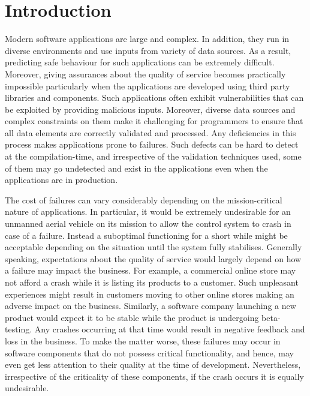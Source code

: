 \section{Introduction}
\label{sec:intro}



Modern software applications are large and complex. In addition, they run in
diverse environments and use inputs from variety of data sources. As a result,
predicting safe behaviour for such applications can be extremely difficult.
Moreover, giving assurances about the quality of service becomes practically
impossible particularly when the applications are developed using third party
libraries and components. Such applications often exhibit vulnerabilities that
can be exploited by providing malicious inputs. Moreover, diverse data sources
and complex constraints on them make it challenging for programmers to ensure
that all data elements are correctly validated and processed. Any deficiencies
in this process makes applications prone to failures.
Such defects can be hard to detect at the compilation-time, and irrespective
of the validation techniques used, some of them may go undetected and exist
in the applications even when the applications are in production.

The cost of failures can vary considerably depending on the mission-critical nature of
applications. In particular, it would be extremely undesirable for an unmanned aerial vehicle on
its mission to allow the control system to crash in case of a failure. Instead a
suboptimal functioning for a short while might be acceptable depending on the situation
until the system fully stabilises. Generally speaking, expectations about the
quality of service would largely depend on how a failure may impact the business.
For example, a commercial online store may not afford a crash while it is listing its
products to a customer. Such unpleasant experiences might result in customers moving
to other online stores making an adverse impact on the business. Similarly, a software
company launching a new product would expect it to be stable while the product
is undergoing beta-testing. Any crashes occurring at that time would result in negative feedback
and loss in the business. To make the matter worse, these failures may occur in
software components that do not possess critical functionality, and hence, may even get less attention
to their quality at the time of development. Nevertheless, irrespective of the criticality
of these components, if the crash occurs it is equally undesirable.

